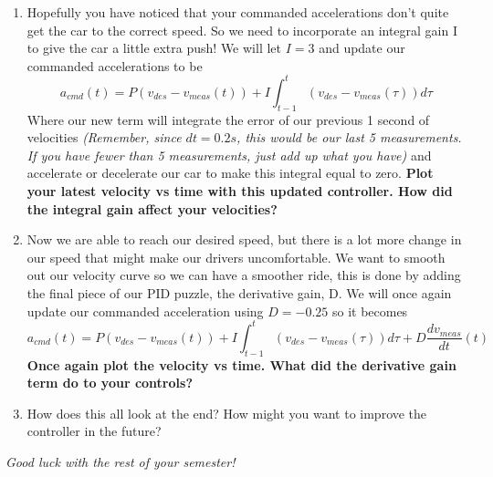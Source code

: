 \documentclass[11pt]{article}
\begin{document}
\begin{enumerate}[label=\alph*)]
		\item Hopefully you have noticed that your commanded accelerations don't quite get the car to the correct speed. So we need to incorporate an integral gain I to give the car a little extra push! We will let $I=3$ and update our commanded accelerations to be \\
		\begin{equation*}
			a_{cmd}(t) = P(v_{des} - v_{meas}(t)) + I\int_{t-1}^{t}(v_{des} - v_{meas}(\tau))d\tau
		\end{equation*}
		Where our new term will integrate the error of our previous 1 second of velocities \textit{(Remember, since $dt = 0.2s$, this would be our last 5 measurements. If you have fewer than 5 measurements, just add up what you have)} and accelerate or decelerate our car to make this integral equal to zero.
		\textbf{Plot your latest velocity vs time with this updated controller. How did the integral gain affect your velocities?}
		\item Now we are able to reach our desired speed, but there is a lot more change in our speed that might make our drivers uncomfortable. We want to smooth out our velocity curve so we can have a smoother ride, this is done by adding the final piece of our PID puzzle, the derivative gain, D. We will once again update our commanded acceleration using $D=-0.25$ so it becomes 
		\begin{equation*}
			a_{cmd}(t) = P(v_{des} - v_{meas}(t)) + I\int_{t-1}^{t}(v_{des} - v_{meas}(\tau))d\tau + D\frac{dv_{meas}}{dt}(t)
		\end{equation*}
		\textbf{Once again plot the velocity vs time. What did the derivative gain term do to your controls?}
		\item How does this all look at the end? How might you want to improve the controller in the future?
	\end{enumerate}
	\begin{center}
		\vfill
		\textit{Good luck with the rest of your semester!}
	\end{center}
\end{document}

